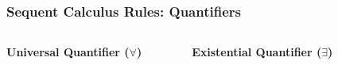\documentclass{beamer}
\begin{document}
      \begin{frame}
      \frametitle{Sequent Calculus Rules: Quantifiers}
      \begin{columns}
      
      \textbf{Universal Quantifier ($\forall$)}
      \begin{prooftree}
      \end{prooftree}
      
      \begin{prooftree}
      \end{prooftree}
      
      \textbf{Existential Quantifier ($\exists$)}
      \begin{prooftree}
      \end{prooftree}
      
      \begin{prooftree}
      \end{prooftree}
      
      \end{columns}
      \end{frame}
      
\end{document}
